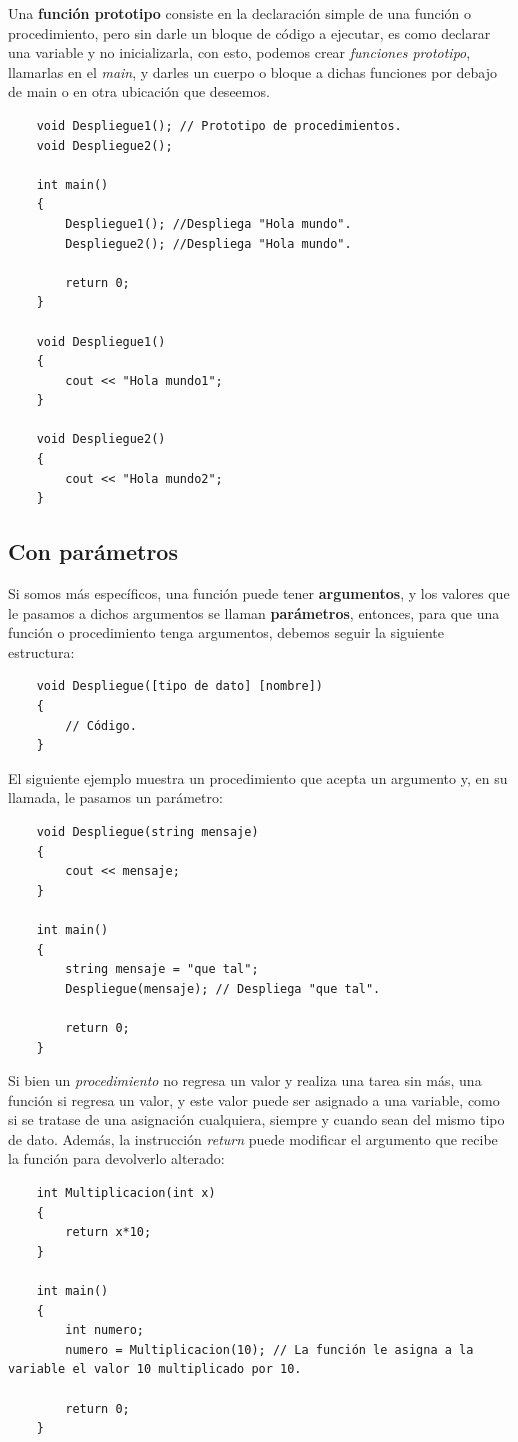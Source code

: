 Una \textbf{función prototipo} consiste en la declaración simple de una función o procedimiento, pero sin darle un bloque de código a ejecutar, es como declarar una variable y no inicializarla, con esto, podemos crear \textit{funciones prototipo}, llamarlas en el \textit{main}, y darles un cuerpo o bloque a dichas funciones por debajo de main o en otra ubicación que deseemos.
\begin{lstlisting}
    void Despliegue1(); // Prototipo de procedimientos.
    void Despliegue2();
    
    int main()
    {
        Despliegue1(); //Despliega "Hola mundo".
        Despliegue2(); //Despliega "Hola mundo".
        
        return 0;
    }
    
    void Despliegue1()
    {
        cout << "Hola mundo1";
    }
    
    void Despliegue2()
    {
        cout << "Hola mundo2";
    }
\end{lstlisting}


\subsection{Con parámetros}
\hspace{0.55cm}Si somos más específicos, una función puede tener \textbf{argumentos}, y los valores que le pasamos a dichos argumentos se llaman \textbf{parámetros}, entonces, para que una función o procedimiento tenga argumentos, debemos seguir la siguiente estructura:
\begin{lstlisting}
    void Despliegue([tipo de dato] [nombre])
    {
        // Código.
    }
\end{lstlisting}

El siguiente ejemplo muestra un procedimiento que acepta un argumento y, en su llamada, le pasamos un parámetro:
\begin{lstlisting}
    void Despliegue(string mensaje)
    {
        cout << mensaje;
    }
    
    int main()
    {
        string mensaje = "que tal";
        Despliegue(mensaje); // Despliega "que tal".
        
        return 0;
    }
\end{lstlisting}

Si bien un \textit{procedimiento} no regresa un valor y realiza una tarea sin más, una función si regresa un valor, y este valor puede ser asignado a una variable, como si se tratase de una asignación cualquiera, siempre y cuando sean del mismo tipo de dato. Además, la instrucción \textit{return} puede modificar el argumento que recibe la función para devolverlo alterado:
\begin{lstlisting}
    int Multiplicacion(int x)
    {
        return x*10;
    }
    
    int main()
    {
        int numero;
        numero = Multiplicacion(10); // La función le asigna a la variable el valor 10 multiplicado por 10.
        
        return 0;
    }
\end{lstlisting}



